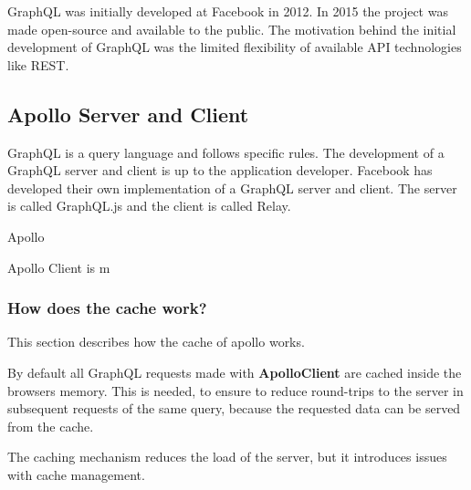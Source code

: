 GraphQL was initially developed at Facebook in 2012. In 2015 the project was made open-source and available to the public. The motivation behind the initial development of GraphQL was the limited flexibility of available API technologies like REST.

\subsection{Apollo Server and Client}

GraphQL is a query language and follows specific rules. The development of a GraphQL server and client is up to the application developer. Facebook has developed their own implementation of a GraphQL server and client. The server is called GraphQL.js and the client is called Relay.

Apollo 

Apollo Client is m

\subsubsection{How does the cache work?}

This section describes how the cache of apollo works.

By default all GraphQL requests made with \textbf{ApolloClient} are cached inside the browsers memory. This is needed, to ensure to reduce round-trips to the server in subsequent requests of the same query, because the requested data can be served from the cache.

The caching mechanism reduces the load of the server, but it introduces issues with cache management.